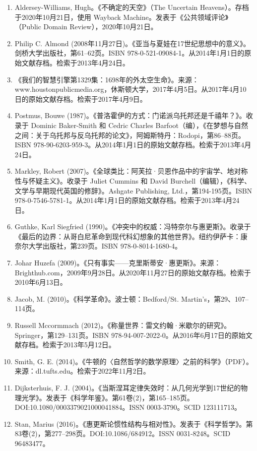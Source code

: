 \begin{enumerate}
\item Aldersey-Williams, Hugh。《不确定的天空》（The Uncertain Heavens）。存档于2020年10月21日，使用 Wayback Machine。发表于《公共领域评论》（Public Domain Review），2020年10月21日。
\item Philip C. Almond (2008年11月27日)。《亚当与夏娃在17世纪思想中的意义》。剑桥大学出版社，第61–62页。ISBN 978-0-521-09084-1。从2014年1月1日的原始文献存档。检索于2013年4月24日。
\item 《我们的智慧引擎第1329集：1698年的外太空生命》。来源：www.houstonpublicmedia.org，休斯顿大学，2017年4月5日。从2017年4月10日的原始文献存档。检索于2017年4月9日。
\item Postmus, Bouwe (1987)。《普洛霍伊的方式：门诺派乌托邦还是千禧年？》。收录于 Dominic Baker-Smith 和 Cedric Charles Barfoot（编），《在梦想与自然之间：关于乌托邦与反乌托邦的论文》，阿姆斯特丹：Rodopi，第86–88页。ISBN 978-90-6203-959-3。从2014年1月1日的原始文献存档。检索于2013年4月24日。
\item Markley, Robert (2007)。《全球类比：阿芙拉·贝恩作品中的宇宙学、地对称性与怀疑主义》。收录于 Juliet Cummins 和 David Burchell（编辑），《科学、文学与早期现代英国的修辞》。Ashgate Publishing, Ltd.，第194-195页。ISBN 978-0-7546-5781-1。从2014年1月1日的原始文献存档。检索于2013年4月24日。
\item Guthke, Karl Siegfried (1990)。《冲突中的权威：冯特奈尔与惠更斯》。收录于 《最后的边界：从哥白尼革命到现代科幻想象的其他世界》。纽约伊萨卡：康奈尔大学出版社，第239页。ISBN 978-0-8014-1680-4。
\item Johar Huzefa (2009)。《只有事实——克里斯蒂安·惠更斯》。来源：Brighthub.com，2009年9月28日。从2020年11月27日的原始文献存档。检索于2010年6月13日。
\item Jacob, M. (2010)。《科学革命》。波士顿：Bedford/St. Martin's，第29、107–114页。
\item Russell Mccormmach (2012)。《称量世界：雷文约翰·米歇尔的研究》。Springer，第129–131页。ISBN 978-94-007-2022-0。从2016年6月17日的原始文献存档。检索于2013年5月12日。
\item Smith, G. E. (2014)。《牛顿的〈自然哲学的数学原理〉之前的科学》（PDF）。来源：dl.tufts.edu。检索于2022年11月2日。
\item Dijksterhuis, F. J. (2004)。《当斯涅耳定律失效时：从几何光学到17世纪的物理光学》。发表于《科学年鉴》。第61卷(2)，第165–185页。DOI:10.1080/0003379021000041884。ISSN 0003-3790。SCID 123111713。
\item Stan, Marius (2016)。《惠更斯论惯性结构与相对性》。发表于《科学哲学》。第83卷(2)，第277–298页。DOI:10.1086/684912。ISSN 0031-8248。SCID 96483477。

\end{enumerate}
